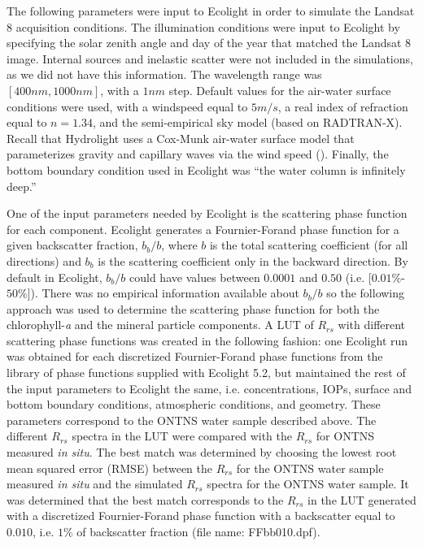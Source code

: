 \documentclass[onecolumn,3p,letterpaper]{elsarticle}
\begin{document}
The following parameters were input to Ecolight in order to simulate the Landsat 8 acquisition conditions. The illumination conditions were input to Ecolight by specifying the solar zenith angle and day of the year that matched the Landsat 8 image. Internal sources and inelastic scatter were not included in the simulations, as we did not have this information. The wavelength range was $[400nm,1000nm]$, with a $1nm$ step. Default values for the air-water surface conditions were used, with a windspeed equal to $5m/s$, a real index of refraction equal to $n=1.34$, and the semi-empirical sky model (based on RADTRAN-X). Recall that Hydrolight uses a Cox-Munk air-water surface model that parameterizes gravity and capillary waves via the wind speed (\cite{MobleyHEtech}). Finally, the bottom boundary condition used in Ecolight was ``the water column is infinitely deep.''

One of the input parameters needed by Ecolight is the scattering phase function for each component. Ecolight generates a Fournier-Forand phase function for a given backscatter fraction, $b_b/b$, where $b$ is the total scattering coefficient (for all directions) and $b_b$ is the scattering coefficient only in the backward direction. By default in Ecolight, $b_b/b$ could have values between $0.0001$ and $0.50$ (i.e. [$0.01\%$-$50\%$]). There was no empirical information available about $b_b/b$ so the following approach was used to determine the scattering phase function for both the chlorophyll-{\it a} and the mineral particle components. A LUT of $R_{rs}$ with different scattering phase functions was created in the following fashion: one Ecolight run was obtained for each discretized Fournier-Forand phase functions from the library of phase functions supplied with Ecolight 5.2, but maintained the rest of the input parameters to Ecolight the same, i.e. concentrations, IOPs, surface and bottom boundary conditions, atmospheric conditions, and geometry. These parameters correspond to the ONTNS water sample described above. The different $R_{rs}$ spectra in the LUT were compared with the $R_{rs}$ for ONTNS measured {\it in situ}. The best match was determined by choosing the lowest root mean squared error (RMSE) between the $R_{rs}$ for the ONTNS water sample measured {\it in situ} and the simulated $R_{rs}$ spectra for the ONTNS water sample. It was determined that the best match corresponds to the $R_{rs}$ in the LUT generated with a discretized Fournier-Forand phase function with a backscatter equal to $0.010$, i.e. $1\%$ of backscatter fraction (file name: FFbb010.dpf). 
\end{document}
